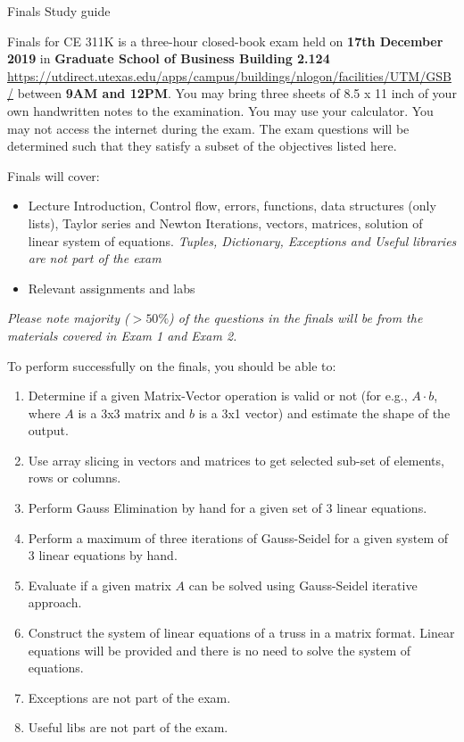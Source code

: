 \documentclass[]{article}
\begin{document}
\begin{center}
\Large Finals Study guide
\end{center}

Finals for CE 311K is a three-hour closed-book exam held on \textbf{17th December 2019} in \textbf{Graduate School of Business Building 2.124} \url{https://utdirect.utexas.edu/apps/campus/buildings/nlogon/facilities/UTM/GSB/} between \textbf{9AM and 12PM}. You may bring three sheets of 8.5 x 11 inch of your own handwritten notes to the examination. You may use your calculator. You may not access the internet during the exam. The exam questions will be determined such that they satisfy a subset of the objectives listed here.

Finals will cover:
\begin{itemize}
	\item Lecture Introduction, Control flow, errors, functions, data structures (only lists), Taylor series and Newton Iterations, vectors, matrices, solution of linear system of equations. \textit{Tuples, Dictionary, Exceptions and Useful libraries are not part of the exam}
	\item Relevant assignments and labs
\end{itemize}

\textit{Please note majority ($>50\%$) of the questions in the finals will be from the materials covered in Exam 1 and Exam 2.} 


To perform successfully on the finals, you should be able to:

\begin{enumerate}
	\item Determine if a given Matrix-Vector operation is valid or not (for e.g., $A\cdot b$, where $A$ is a 3x3 matrix and $b$ is a 3x1 vector) and estimate the shape of the output.
	\item Use array slicing in vectors and matrices to get selected sub-set of elements, rows or columns.
	\item Perform Gauss Elimination by hand for a given set of 3 linear equations.
	\item Perform a maximum of three iterations of Gauss-Seidel for a given system of 3 linear equations by hand.
	\item Evaluate if a given matrix $A$ can be solved using Gauss-Seidel iterative approach.
	\item Construct the system of linear equations of a truss in a matrix format. Linear equations will be provided and there is no need to solve the system of equations.
	\item Exceptions are not part of the exam.
	\item Useful libs are not part of the exam.
\end{enumerate}
\end{document}

